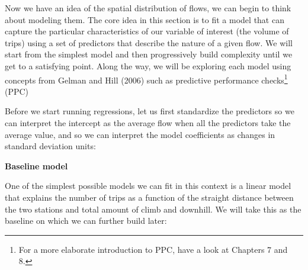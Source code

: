 \documentclass[
  letterpaper,
  krantz2]{style/krantz}
\newenvironment{Shaded}{\begin{snugshade}}{\end{snugshade}}
\newcommand{\CommentTok}[1]{\textcolor[rgb]{0.37,0.37,0.37}{#1}}
\newcommand{\FunctionTok}[1]{\textcolor[rgb]{0.28,0.35,0.67}{#1}}
\newcommand{\NormalTok}[1]{\textcolor[rgb]{0.00,0.23,0.31}{#1}}
\newcommand{\OtherTok}[1]{\textcolor[rgb]{0.00,0.23,0.31}{#1}}
\newcommand{\SpecialCharTok}[1]{\textcolor[rgb]{0.37,0.37,0.37}{#1}}
\begin{document}
Now we have an idea of the spatial distribution of flows, we can begin
to think about modeling them. The core idea in this section is to fit a
model that can capture the particular characteristics of our variable of
interest (the volume of trips) using a set of predictors that describe
the nature of a given flow. We will start from the simplest model and
then progressively build complexity until we get to a satisfying point.
Along the way, we will be exploring each model using concepts from
Gelman and Hill (2006) such as predictive performance checks\footnote{For
  a more elaborate introduction to PPC, have a look at Chapters 7 and 8.}
(PPC)

Before we start running regressions, let us first standardize the
predictors so we can interpret the intercept as the average flow when
all the predictors take the average value, and so we can interpret the
model coefficients as changes in standard deviation units:

\begin{Shaded}
\end{Shaded}

\textbf{Baseline model}

One of the simplest possible models we can fit in this context is a
linear model that explains the number of trips as a function of the
straight distance between the two stations and total amount of climb and
downhill. We will take this as the baseline on which we can further
build later:
\end{document}
